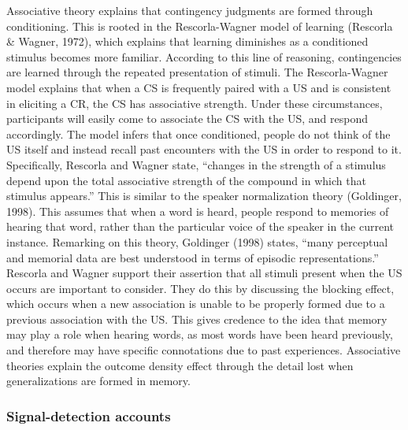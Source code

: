 \documentclass[
  english,
  man,floatsintext]{apa6}
\begin{document}
Associative theory explains that contingency judgments are formed through conditioning. This is rooted in the Rescorla-Wagner model of learning (Rescorla \& Wagner, 1972), which explains that learning diminishes as a conditioned stimulus becomes more familiar. According to this line of reasoning, contingencies are learned through the repeated presentation of stimuli. The Rescorla-Wagner model explains that when a CS is frequently paired with a US and is consistent in eliciting a CR, the CS has associative strength. Under these circumstances, participants will easily come to associate the CS with the US, and respond accordingly. The model infers that once conditioned, people do not think of the US itself and instead recall past encounters with the US in order to respond to it. Specifically, Rescorla and Wagner state, ``changes in the strength of a stimulus depend upon the total associative strength of the compound in which that stimulus appears.'' This is similar to the speaker normalization theory (Goldinger, 1998). This assumes that when a word is heard, people respond to memories of hearing that word, rather than the particular voice of the speaker in the current instance. Remarking on this theory, Goldinger (1998) states, ``many perceptual and memorial data are best understood in terms of episodic representations.'' Rescorla and Wagner support their assertion that all stimuli present when the US occurs are important to consider. They do this by discussing the blocking effect, which occurs when a new association is unable to be properly formed due to a previous association with the US. This gives credence to the idea that memory may play a role when hearing words, as most words have been heard previously, and therefore may have specific connotations due to past experiences. Associative theories explain the outcome density effect through the detail lost when generalizations are formed in memory.

\hypertarget{signal-detection-accounts}{%
\subsubsection{Signal-detection accounts}\label{signal-detection-accounts}}
\end{document}
